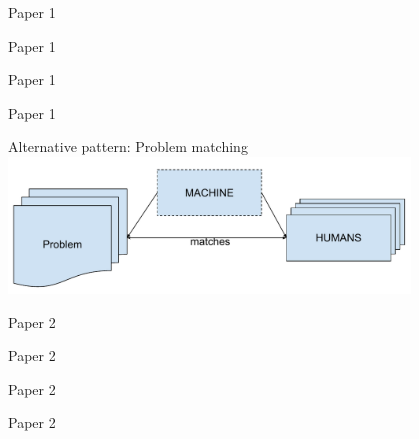 \documentclass[11pt]{beamer}
\begin{document}
\begin{frame}{Paper 1}
\end{frame}

\begin{frame}{Paper 1}
\end{frame}


\begin{frame}{Paper 1}
\end{frame}


\begin{frame}{Paper 1}
\end{frame}


\begin{frame}{Alternative pattern: Problem matching}
	\centering
\includegraphics[width=0.8\textwidth]{Figures/matching.pdf}
\end{frame}


\begin{frame}{Paper 2}
\end{frame}

\begin{frame}{Paper 2}
\end{frame}


\begin{frame}{Paper 2}
\end{frame}


\begin{frame}{Paper 2}
\end{frame}
\end{document}
